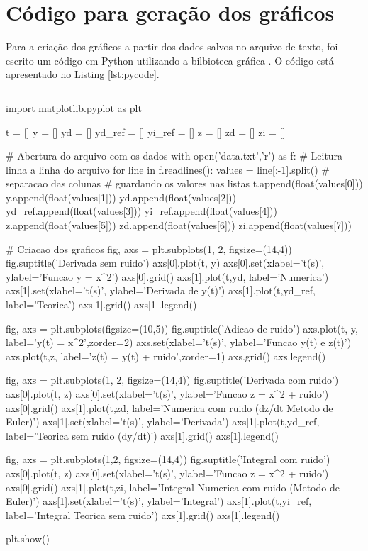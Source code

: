 \documentclass[
	12pt,				%
	openany,			%
	twoside,			%
	a4paper,			%
	english,			%
	french,				%
	spanish,			%
	brazil,				%
	]{abntex2}
\begin{document}
\section{Código para geração dos gráficos}
Para a criação dos gráficos a partir dos dados salvos no arquivo de texto, foi escrito um código em Python utilizando a bilbioteca gráfica . O código está apresentado no Listing \ref{lst:pycode}.

\begin{lstlisting}[frame=none,caption={Código Python para geração dos gráficos.},captionpos=t,label=lst:pycode]
\end{lstlisting}
\begin{python}
import matplotlib.pyplot as plt

t = []
y = []
yd = []
yd_ref = []
yi_ref = []
z = []
zd = []
zi = []

# Abertura do arquivo com os dados
with open('data.txt','r') as f:
    # Leitura linha a linha do arquivo
    for line in f.readlines():
        values = line[:-1].split() # separacao das colunas
        # guardando os valores nas listas
        t.append(float(values[0]))
        y.append(float(values[1]))
        yd.append(float(values[2]))
        yd_ref.append(float(values[3]))
        yi_ref.append(float(values[4]))
        z.append(float(values[5]))
        zd.append(float(values[6]))
        zi.append(float(values[7]))

# Criacao dos graficos
fig, axs = plt.subplots(1, 2, figsize=(14,4))
fig.suptitle('Derivada sem ruido')
axs[0].plot(t, y)
axs[0].set(xlabel='t(s)', ylabel='Funcao y = x^2')
axs[0].grid()
axs[1].plot(t,yd, label='Numerica')
axs[1].set(xlabel='t(s)', ylabel='Derivada de y(t)')
axs[1].plot(t,yd_ref, label='Teorica')
axs[1].grid()
axs[1].legend()

fig, axs = plt.subplots(figsize=(10,5))
fig.suptitle('Adicao de ruido')
axs.plot(t, y, label='y(t) = x^2',zorder=2)
axs.set(xlabel='t(s)', ylabel='Funcao y(t) e z(t)')
axs.plot(t,z, label='z(t) = y(t) + ruido',zorder=1)
axs.grid()
axs.legend()

fig, axs = plt.subplots(1, 2, figsize=(14,4))
fig.suptitle('Derivada com ruido')
axs[0].plot(t, z)
axs[0].set(xlabel='t(s)', ylabel='Funcao z = x^2 + ruido')
axs[0].grid()
axs[1].plot(t,zd, label='Numerica com ruido (dz/dt Metodo de Euler)')
axs[1].set(xlabel='t(s)', ylabel='Derivada')
axs[1].plot(t,yd_ref, label='Teorica sem ruido (dy/dt)')
axs[1].grid()
axs[1].legend()

fig, axs = plt.subplots(1,2, figsize=(14,4))
fig.suptitle('Integral com ruido')
axs[0].plot(t, z)
axs[0].set(xlabel='t(s)', ylabel='Funcao z = x^2 + ruido')
axs[0].grid()
axs[1].plot(t,zi, label='Integral Numerica com ruido (Metodo de Euler)')
axs[1].set(xlabel='t(s)', ylabel='Integral')
axs[1].plot(t,yi_ref, label='Integral Teorica sem ruido')
axs[1].grid()
axs[1].legend()

plt.show()
\end{python}
\end{document}

